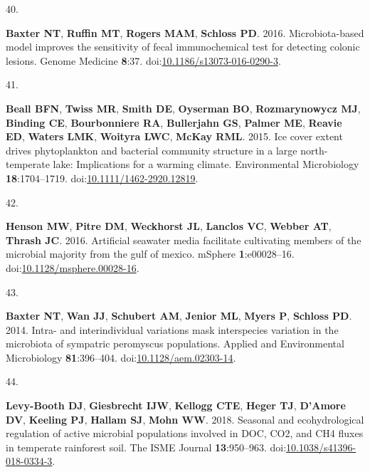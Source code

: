 \documentclass[
]{article}
\newlength{\cslhangindent}
\newlength{\csllabelwidth}
\newlength{\cslentryspacingunit} %
\newenvironment{CSLReferences}[2] %
 {%
  \setlength{\parindent}{0pt}
  \ifodd #1
  \let\oldpar\par
  \def\par{\hangindent=\cslhangindent\oldpar}
  \fi
  \setlength{\parskip}{#2\cslentryspacingunit}
 }%
 {}
\newcommand{\CSLLeftMargin}[1]{\parbox[t]{\csllabelwidth}{#1}}
\newcommand{\CSLRightInline}[1]{\parbox[t]{\linewidth - \csllabelwidth}{#1}\break}
\begin{document}
\begin{CSLReferences}{0}{1}
\leavevmode{}%
\CSLLeftMargin{40. }%
\CSLRightInline{\textbf{Baxter NT}, \textbf{Ruffin MT}, \textbf{Rogers
MAM}, \textbf{Schloss PD}. 2016. Microbiota-based model improves the
sensitivity of fecal immunochemical test for detecting colonic lesions.
Genome Medicine \textbf{8}:37.
doi:\href{https://doi.org/10.1186/s13073-016-0290-3}{10.1186/s13073-016-0290-3}.}

\leavevmode{}%
\CSLLeftMargin{41. }%
\CSLRightInline{\textbf{Beall BFN}, \textbf{Twiss MR}, \textbf{Smith
DE}, \textbf{Oyserman BO}, \textbf{Rozmarynowycz MJ}, \textbf{Binding
CE}, \textbf{Bourbonniere RA}, \textbf{Bullerjahn GS}, \textbf{Palmer
ME}, \textbf{Reavie ED}, \textbf{Waters LMK}, \textbf{Woityra LWC},
\textbf{McKay RML}. 2015. Ice cover extent drives phytoplankton and
bacterial community structure in a large north-temperate lake:
Implications for a warming climate. Environmental Microbiology
\textbf{18}:1704--1719.
doi:\href{https://doi.org/10.1111/1462-2920.12819}{10.1111/1462-2920.12819}.}

\leavevmode{}%
\CSLLeftMargin{42. }%
\CSLRightInline{\textbf{Henson MW}, \textbf{Pitre DM}, \textbf{Weckhorst
JL}, \textbf{Lanclos VC}, \textbf{Webber AT}, \textbf{Thrash JC}. 2016.
Artificial seawater media facilitate cultivating members of the
microbial majority from the gulf of mexico. {mSphere}
\textbf{1}:e00028--16.
doi:\href{https://doi.org/10.1128/msphere.00028-16}{10.1128/msphere.00028-16}.}

\leavevmode{}%
\CSLLeftMargin{43. }%
\CSLRightInline{\textbf{Baxter NT}, \textbf{Wan JJ}, \textbf{Schubert
AM}, \textbf{Jenior ML}, \textbf{Myers P}, \textbf{Schloss PD}. 2014.
Intra- and interindividual variations mask interspecies variation in the
microbiota of sympatric peromyscus populations. Applied and
Environmental Microbiology \textbf{81}:396--404.
doi:\href{https://doi.org/10.1128/aem.02303-14}{10.1128/aem.02303-14}.}

\leavevmode{}%
\CSLLeftMargin{44. }%
\CSLRightInline{\textbf{Levy-Booth DJ}, \textbf{Giesbrecht IJW},
\textbf{Kellogg CTE}, \textbf{Heger TJ}, \textbf{D'Amore DV},
\textbf{Keeling PJ}, \textbf{Hallam SJ}, \textbf{Mohn WW}. 2018.
Seasonal and ecohydrological regulation of active microbial populations
involved in {DOC}, {CO}2, and {CH}4 fluxes in temperate rainforest soil.
The {ISME} Journal \textbf{13}:950--963.
doi:\href{https://doi.org/10.1038/s41396-018-0334-3}{10.1038/s41396-018-0334-3}.}


\end{CSLReferences}
\end{document}
